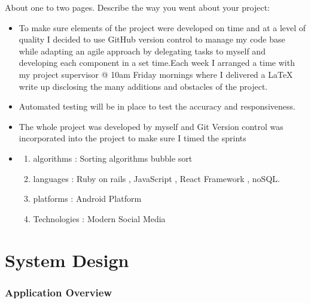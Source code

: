 About one to two pages.
Describe the way you went about your project:
\begin{itemize}
\item  %
To make sure elements of the project were developed on time and at a level of quality I decided to use GitHub version control to manage my code base while adapting an agile approach by delegating tasks to myself and developing each component in a set time.Each week I arranged a time  with my project supervisor @ 10am Friday mornings where I delivered a LaTeX write up disclosing the many additions and obstacles of the project.


\item %

Automated testing will be in place to test the accuracy and responsiveness.


\item %

The whole project was developed by myself and Git Version control was incorporated into the project to make sure I timed the sprints 


\item %



\begin{enumerate}
  \item algorithms : Sorting algorithms bubble sort
  \item languages  : Ruby on rails , JavaScript , React Framework , noSQL.  
\item platforms  : Android Platform

\item Technologies   : Modern Social Media 

\end{enumerate}

\end{itemize}

\chapter{System Design}

\subsection{Application Overview  }
